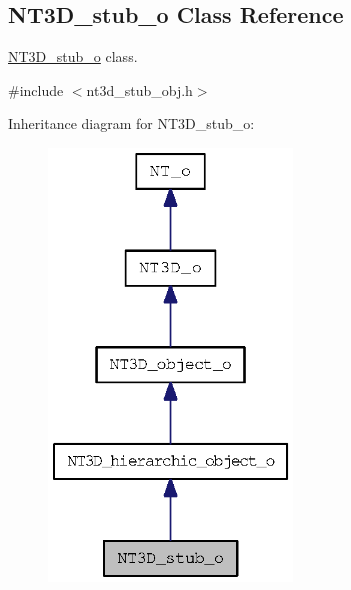 \subsection{NT3D\_\-stub\_\-o Class Reference}
\label{class_n_t3_d__stub__o}


\hyperlink{class_n_t3_d__stub__o}{NT3D\_\-stub\_\-o} class.  




{\ttfamily \#include $<$nt3d\_\-stub\_\-obj.h$>$}



Inheritance diagram for NT3D\_\-stub\_\-o:
\nopagebreak
\begin{figure}[H]
\begin{center}
\leavevmode
\includegraphics[width=184pt]{class_n_t3_d__stub__o__inherit__graph}
\end{center}
\end{figure}


